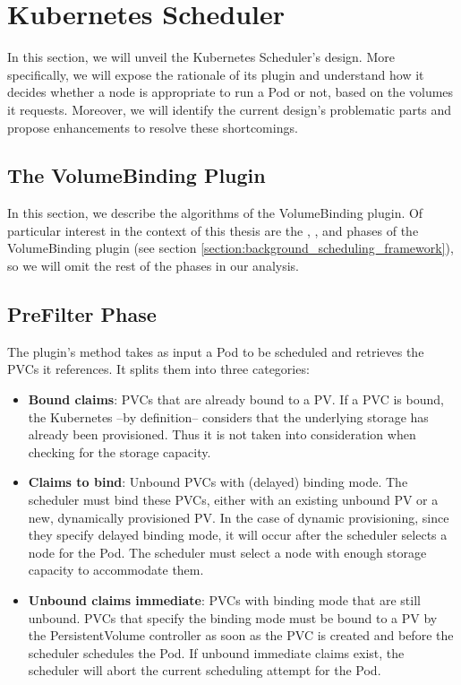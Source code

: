 \section{Kubernetes Scheduler}



In this section, we will unveil the Kubernetes Scheduler's design. More
specifically, we will expose the rationale of its  plugin and
understand how it decides whether a node is appropriate to run a Pod or not,
based on the volumes it requests. Moreover, we will identify the current
design's problematic parts and propose enhancements to resolve these
shortcomings.

\subsection{The VolumeBinding Plugin}

In this section, we describe the algorithms of the VolumeBinding plugin. Of
particular interest in the context of this thesis are the ,
, and  phases of the VolumeBinding plugin (see section
\ref{section:background_scheduling_framework}), so we will omit the rest of the
phases in our analysis.

\label{section:design-volume-binding}

\subsection*{PreFilter Phase}
The  plugin's  method takes as input a Pod to
be scheduled and retrieves the PVCs it references. It splits them into three
categories:
\begin{itemize}
      \tightlist
      \item \textbf{Bound claims}: PVCs that are already bound to a PV. If a PVC
            is bound, the Kubernetes --by definition-- considers that the
            underlying storage has already been provisioned. Thus it is not
            taken into consideration when checking for the storage capacity.
      \item \textbf{Claims to bind}: Unbound PVCs with 
            (delayed) binding mode. The scheduler must bind these PVCs, either
            with an existing unbound PV or a new, dynamically provisioned PV. In
            the case of dynamic provisioning, since they specify delayed binding
            mode, it will occur after the scheduler selects a node for the Pod.
            The scheduler must select a node with enough storage capacity to
            accommodate them.
      \item \textbf{Unbound claims immediate}: PVCs with  binding
            mode that are still unbound. PVCs that specify the 
            binding mode must be bound to a PV by the PersistentVolume
            controller as soon as the PVC is created and before the scheduler
            schedules the Pod. If unbound immediate claims exist, the scheduler
            will abort the current scheduling attempt for the Pod.
\end{itemize}

